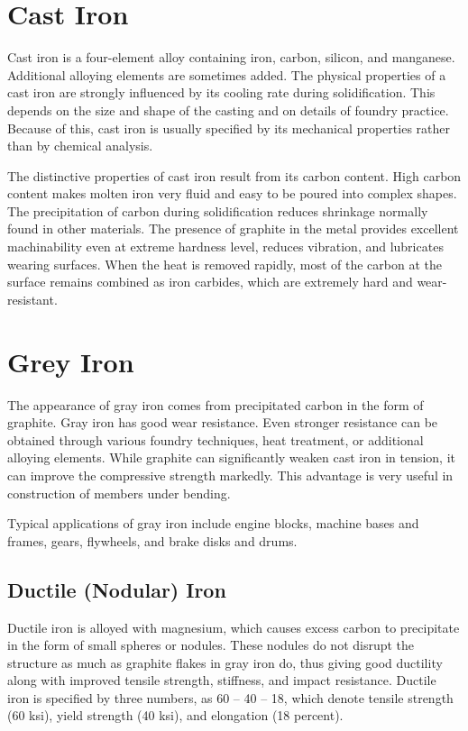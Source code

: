 \documentclass[a4paper,openany,12pt]{book}
\begin{document}
\section{Cast Iron}
\label{cast-iron}
Cast iron is a four-element alloy containing iron, carbon, silicon, and
manganese. Additional alloying elements are sometimes added. The
physical properties of a cast iron are strongly influenced by its
cooling rate during solidification. This depends on the size and shape
of the casting and on details of foundry practice. Because of this, cast
iron is usually specified by its mechanical properties rather than by
chemical analysis.

The distinctive properties of cast iron result from its carbon content.
High carbon content makes molten iron very fluid and easy to be poured
into complex shapes. The precipitation of carbon during solidification
reduces shrinkage normally found in other materials. The presence of
graphite in the metal provides excellent machinability even at extreme
hardness level, reduces vibration, and lubricates wearing surfaces. When
the heat is removed rapidly, most of the carbon at the surface remains
combined as iron carbides, which are extremely hard and wear-resistant.

\section{Grey Iron}
\label{grey-iron}
The appearance of gray iron comes from precipitated carbon in the form
of graphite. Gray iron has good wear resistance. Even stronger
resistance can be obtained through various foundry techniques, heat
treatment, or additional alloying elements. While graphite can
significantly weaken cast iron in tension, it can improve the
compressive strength markedly. This advantage is very useful in
construction of members under bending.

Typical applications of gray iron include engine blocks, machine bases
and frames, gears, flywheels, and brake disks and drums.

\subsection{Ductile (Nodular) Iron}
\label{ductile-nodular-iron}
Ductile iron is alloyed with magnesium, which causes excess carbon to
precipitate in the form of small spheres or nodules. These nodules do
not disrupt the structure as much as graphite flakes in gray iron do,
thus giving good ductility along with improved tensile strength,
stiffness, and impact resistance. Ductile iron is specified by three
numbers, as 60 -- 40 -- 18, which denote tensile strength (60 ksi),
yield strength (40 ksi), and elongation (18 percent).
\end{document}
